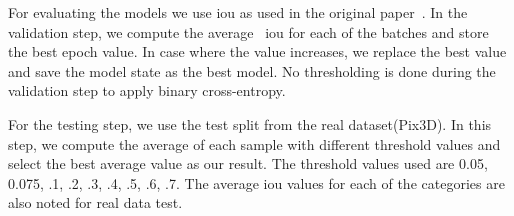 For evaluating the models we use \gls{iou} as used in the original paper~\cite{Xie_2019}.
In the validation step, we compute the average ~\gls{iou} for each of the batches and store the best epoch value.
In case where the value increases, we replace the best value and save the model state as the best model.
No thresholding is done during the validation step to apply binary cross-entropy.

For the testing step, we use the test split from the real dataset(Pix3D).
In this step, we compute the average of each sample with different threshold values and select the best average value as our result.
The threshold values used are 0.05, 0.075, .1, .2, .3, .4, .5, .6, .7.
The average \gls{iou }values for each of the categories are also noted for real data test.



